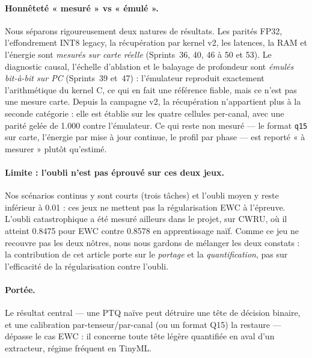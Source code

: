 \paragraph{Honnêteté « mesuré » vs « émulé ».} Nous séparons rigoureusement deux natures de résultats. Les
parités FP32, l'effondrement INT8 legacy, la récupération par kernel v2, les latences, la RAM et l'énergie
sont \emph{mesurés sur carte réelle} (Sprints~36, 40, 46 à 50 et 53). Le diagnostic causal, l'échelle
d'ablation et le balayage de profondeur sont \emph{émulés bit-à-bit sur PC} (Sprints~39 et~47) : l'émulateur
reproduit exactement l'arithmétique du kernel C, ce qui en fait une référence fiable, mais ce n'est pas une
mesure carte. Depuis la campagne v2, la récupération n'appartient plus à la seconde catégorie : elle est
établie sur les quatre cellules per-canal, avec une parité gelée de \num{1.000} contre l'émulateur. Ce qui
reste non mesuré --- le format \texttt{q15} sur carte, l'énergie par mise à jour continue, le profil par
phase --- est reporté « à mesurer » plutôt qu'estimé.

\paragraph{Limite : l'oubli n'est pas éprouvé sur ces deux jeux.} Nos scénarios continus y sont courts
(trois tâches) et l'oubli moyen y reste inférieur à \num{0.01} : ces jeux ne mettent pas la régularisation
EWC à l'épreuve. L'oubli catastrophique a été mesuré ailleurs dans le projet, sur CWRU, où il atteint
\num{0.8475} pour EWC contre \num{0.8578} en apprentissage naïf. Comme ce jeu ne recouvre pas les deux
nôtres, nous nous gardons de mélanger les deux constats : la contribution de cet article porte sur le
\emph{portage} et la \emph{quantification}, pas sur l'efficacité de la régularisation contre l'oubli.

\paragraph{Portée.} Le résultat central --- une PTQ naïve peut détruire une tête de décision binaire, et une
calibration par-tenseur/par-canal (ou un format Q15) la restaure --- dépasse le cas EWC : il concerne toute
tête légère quantifiée en aval d'un extracteur, régime fréquent en TinyML.

